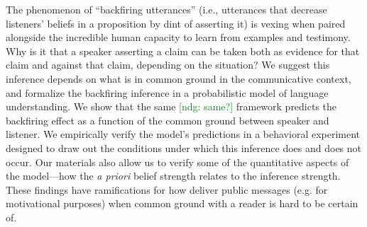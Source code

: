 \documentclass[10pt,letterpaper]{article}
\newcommand{\red}[1]{\textcolor{Red}{#1}}
\newcommand{\ndg}[1]{\textcolor{Green}{[ndg: #1]}}
\begin{document}
%




The phenomenon of ``backfiring utterances'' (i.e., utterances that decrease listeners' beliefs in a proposition by dint of asserting it) is vexing when paired alongside the incredible human capacity to learn from examples and testimony. 
Why is it that a speaker asserting a claim can be taken both as evidence for that claim and against that claim, depending on the situation? 
We suggest this inference depends on what is in common ground in the communicative context, and formalize the backfiring inference in a probabilistic model of language understanding.
We show that the same \ndg{same?} framework predicts the backfiring effect as a function of the common ground between speaker and listener.
We empirically verify the model's predictions in a behavioral experiment designed to draw out the conditions under which this inference does and does not occur. 
Our materials also allow us to verify some of the quantitative aspects of the model---how the \emph{a priori} belief strength relates to the inference strength.
These findings have ramifications for how deliver public messages (e.g. for motivational purposes) when common ground with a reader is hard to be certain of. 
\end{document}

